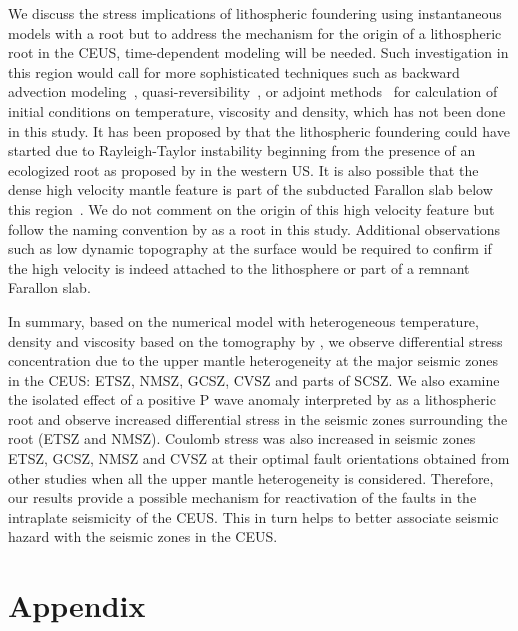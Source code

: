 \documentclass[draft,linenumbers]{agujournal2018}
\begin{document}
    
    We discuss the stress implications of lithospheric foundering using instantaneous models with a root but to address the mechanism for the origin of a lithospheric root in the CEUS, time-dependent modeling will be needed. Such investigation in this region would call for more sophisticated techniques such as backward advection modeling~\citep[e.g.,][]{conrad2003seismic}, quasi-reversibility~\citep{glivsovic2016new}, or adjoint methods~\citep[e.g.,][]{bunge2003mantle, liu2008reconstructing} for calculation of initial conditions on temperature, viscosity and density, which has not been done in this study. It has been proposed by \citep{Biryol_2016} that the lithospheric foundering could have started due to Rayleigh-Taylor instability beginning from the presence of an ecologized root as proposed by \citet{le2006mantle} in the western US. It is also possible that the dense high velocity mantle feature is part of the subducted Farallon slab below this region~\citep{schmandt2010seismic}. We do not comment on the origin of this high velocity feature but follow the naming convention by \citet{Biryol_2016} as a root in this study. Additional observations such as low dynamic topography at the surface would be required to confirm if the high velocity is indeed attached to the lithosphere or part of a remnant Farallon slab.
    
    In summary, based on the numerical model with heterogeneous temperature, density and viscosity based on the tomography by \citet{Biryol_2016}, we observe differential stress concentration due to the upper mantle heterogeneity at the major seismic zones in the CEUS: ETSZ, NMSZ, GCSZ, CVSZ and parts of SCSZ. We also examine the isolated effect of a positive P wave anomaly interpreted by \citet{Biryol_2016} as a lithospheric root and observe increased differential stress in the seismic zones surrounding the root (ETSZ and NMSZ). Coulomb stress was also increased in seismic zones ETSZ, GCSZ, NMSZ and CVSZ at their optimal fault orientations obtained from other studies when all the upper mantle heterogeneity is considered. Therefore, our results provide a possible mechanism for reactivation of the faults in the intraplate seismicity of the CEUS. This in turn helps to better associate seismic hazard with the seismic zones in the CEUS.
    
\appendix
\section{Appendix}
\end{document}

